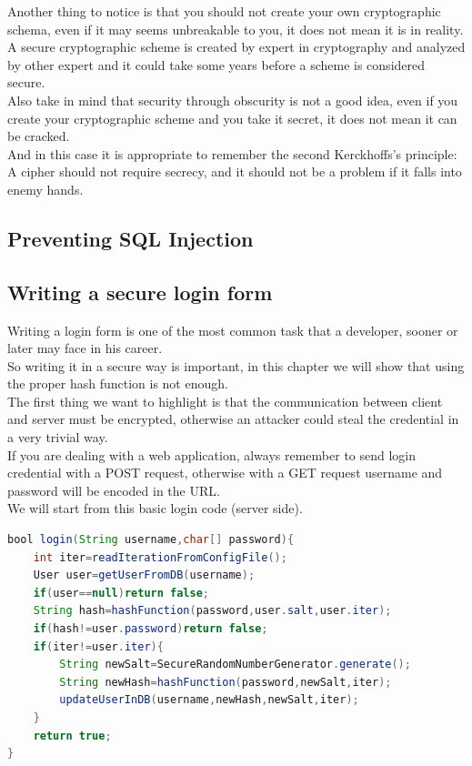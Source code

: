 Another thing to notice is that you should not create your own cryptographic schema, even if it may seems unbreakable to you, it does not mean it is in reality.\\
A secure cryptographic scheme is created by expert in cryptography and analyzed by other expert and it could take some years before a scheme is considered secure.\\
Also take in mind that security through obscurity is not a good idea, even if you create your cryptographic scheme and you take it secret, it does not mean it can be cracked.\\
And in this case it is appropriate to remember the second Kerckhoffs's principle:
A cipher should not require secrecy, and it should not be a problem if it falls into enemy hands.\\

\subsection{Preventing SQL Injection}

\subsection{Writing a secure login form}
Writing a login form is one of the most common task that a developer, sooner or later may face in his career.\\
So writing it in a secure way is important, in this chapter we will show that using the proper hash function is not enough.\\
The first thing we want to highlight is that the communication between client and server must be encrypted, otherwise an attacker could steal the credential in a very trivial way.\\
If you are dealing with a web application, always remember to send login credential with a POST request, otherwise with a GET request username and password will be encoded in the URL.\\
We will start from this basic login code (server side).\\
\begin{lstlisting}[language=Java]
bool login(String username,char[] password){
	int iter=readIterationFromConfigFile();
	User user=getUserFromDB(username);
	if(user==null)return false;
	String hash=hashFunction(password,user.salt,user.iter);
	if(hash!=user.password)return false;
	if(iter!=user.iter){
		String newSalt=SecureRandomNumberGenerator.generate();
		String newHash=hashFunction(password,newSalt,iter);
		updateUserInDB(username,newHash,newSalt,iter);
	}
	return true;
}
\end{lstlisting}



